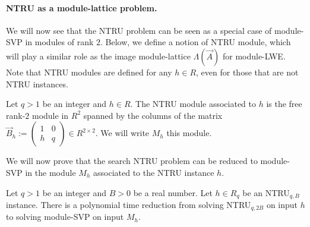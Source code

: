 
\paragraph{NTRU as a module-lattice problem.} We will now see that the NTRU problem can be seen as a special case of module-SVP in modules of rank $2$. Below, we define a notion of NTRU module, which will play a similar role as the image module-lattice $\Lambda(\vec A)$ for module-LWE. Note that NTRU modules are defined for any $h \in R$, even for those that are not NTRU instances.

\begin{definition}
\label{def:NTRU-module}
Let $q > 1$ be an integer and $h \in R$. The NTRU module associated to $h$ is the free rank-$2$ module in $R^2$ spanned by the columns of the matrix
$\vec B_h := \begin{pmatrix}
1 & 0 \\
h & q
\end{pmatrix} \in R^{2 \times 2}$.
We will write $M_h$ this module.
\end{definition}

We will now prove that the search NTRU problem can be reduced to module-SVP in the module $M_h$ associated to the NTRU instance $h$.

\begin{lemma}
Let $q >1$ be an integer and $B >0$ be a real number. Let $h \in R_q$ be an NTRU$_{q,B}$ instance. There is a polynomial time reduction from solving NTRU$_{q,2B}$ on input $h$ to solving module-SVP on input $M_h$.
\end{lemma}

